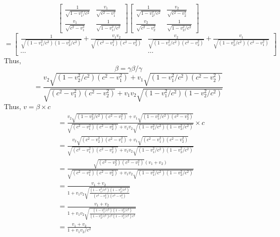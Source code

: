 \documentclass{article}
\begin{document}
\begin{itemize}
                \[\begin{bmatrix} 
                        \frac{1}{\sqrt{1-v_1^2/c^2}}& \frac{v_1}{\sqrt{c^2-v_1^2}}\\
                        \frac{v_1}{\sqrt{c^2-v_1^2}}& \frac{1}{\sqrt{1-v_1^2/c^2}}
                \end{bmatrix}
                \begin{bmatrix}
                    \frac{1}{\sqrt{1-v_2^2/c^2}}& \frac{v_2}{\sqrt{c^2-v_2^2}}\\
                    \frac{v_2}{\sqrt{c^2-v_2^2}}& \frac{1}{\sqrt{1-v_2^2/c^2}}
                \end{bmatrix}\]\[=
                \begin{bmatrix}
                    \frac{1}{\sqrt{(1-v_1^2/c^2)(1-v_2^2/c^2)}}+\frac{v_1v_2}{\sqrt{(c^2-v_1^2)(c^2-v_2^2)}}&
                    \frac{v_2}{\sqrt{(1-v_1^2/c^2)(c^2-v_2^2)}}+\frac{v_1}{\sqrt{(1-v_2^2/c^2)(c^2-v_1^2)}}
                    \\ \cdots&\cdots
                \end{bmatrix}\]
                Thus, \[\beta = \gamma \beta / \gamma\]
                \[=\frac{v_2\sqrt{(1-v_2^2/c^2)(c^2-v_1^2)}+v_1\sqrt{(1-v_1^2/c^2)(c^2-v_2^2)}}{\sqrt{(c^2-v_1^2)(c^2-v_2^2)}+v_1v_2\sqrt{(1-v_1^2/c^2)(1-v_2^2/c^2)}}\]
                Thus, \(v = \beta \times c\)
                \begin{align*}
                    &=\frac{v_2\sqrt{(1-v_2^2/c^2)(c^2-v_1^2)}+v_1\sqrt{(1-v_1^2/c^2)(c^2-v_2^2)}}{\sqrt{(c^2-v_1^2)(c^2-v_2^2)}+v_1v_2\sqrt{(1-v_1^2/c^2)(1-v_2^2/c^2)}}
                    \times c\\&=\frac{v_2\sqrt{(c^2-v_2^2)(c^2-v_1^2)}+v_1\sqrt{(c^2-v_1^2)(c^2-v_2^2)}}{\sqrt{(c^2-v_1^2)(c^2-v_2^2)}+v_1v_2\sqrt{(1-v_1^2/c^2)(1-v_2^2/c^2)}}
                    \\&=\frac{\sqrt{(c^2-v_2^2)(c^2-v_1^2)}(v_1+v_2)}{\sqrt{(c^2-v_1^2)(c^2-v_2^2)}+v_1v_2\sqrt{(1-v_1^2/c^2)(1-v_2^2/c^2)}}
                    \\&=\frac{v_1+v_2}{1+v_1v_2\sqrt{\frac{(1-v_1^2/c^2)(1-v_2^2/c^2)}{(c^2-v_2^2)(c^2-v_1^2)}}}
                    \\&=\frac{v_1+v_2}{1+v_1v_2\sqrt{\frac{(1-v_1^2/c^2)(1-v_2^2/c^2)}{(1-v_2^2/c^2)c^2(1-v_1^2/c^2)c^2}}}
                    \\&=\frac{v_1+v_2}{1+v_1v_2/c^2}
                \end{align*}
\end{itemize}
\end{document}
